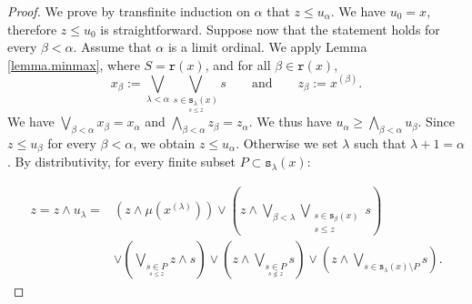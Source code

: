 \documentclass{article}
\begin{document}
\begin{proof}
{We prove by transfinite induction on \(\alpha\) that \(z\leq u_\alpha\). We have $u_0 = x$, therefore $z \le u_{0}$ is straightforward. Suppose now that the statement holds for every \(\beta<\alpha\). Assume that \(\alpha\) is a limit ordinal. We apply Lemma \ref{lemma.minmax}, where $S = \texttt{r}(x)$, and for all $\beta \in \texttt{r}(x)$,
\[x_{\beta} := \bigvee_{\lambda < \alpha} \bigvee_{\underset{s \le z}{s \in \texttt{s}_{\lambda}(x)}}s \qquad \text{and} \qquad z_{\beta} := x^{(\beta)}.\]
We have $\bigvee_{\beta < \alpha} x_{\beta} = x_{\alpha}$ and 
$\bigwedge_{\beta < \alpha} z_{\beta} = z_{\alpha}$.
We thus have \(u_\alpha \ge \bigwedge_{\beta<\alpha}u_\beta\). Since \(z\leq u_\beta\) for every \(\beta<\alpha\), we obtain \(z\le u_\alpha\).} 
Otherwise we set $\lambda$ such that $\lambda + 1 = \alpha$. By distributivity, for every finite subset {$P \subset \texttt{s}_{\lambda}(x)$}:
{
\[
\begin{aligned}
z = z \wedge u_{\lambda}
  ={}&(z \wedge \mu(x^{(\lambda)}))
   \vee \left(z \wedge \bigvee_{\beta < \lambda}
        \bigvee_{\substack{s \in \texttt{s}_{\beta}(x)\\ s \le z}} s\right) \\
   &\vee \left(\bigvee_{\underset{s \le z}{s \in P}} z \wedge s\right) \vee \left(z \wedge\bigvee_{\underset{s \not \le z}{s \in P}} s\right)
   \vee \left(z \wedge \bigvee_{s \in \texttt{s}_{\lambda}(x)\setminus P} s\right).
\end{aligned}
\]

}
\end{proof}
\end{document}
